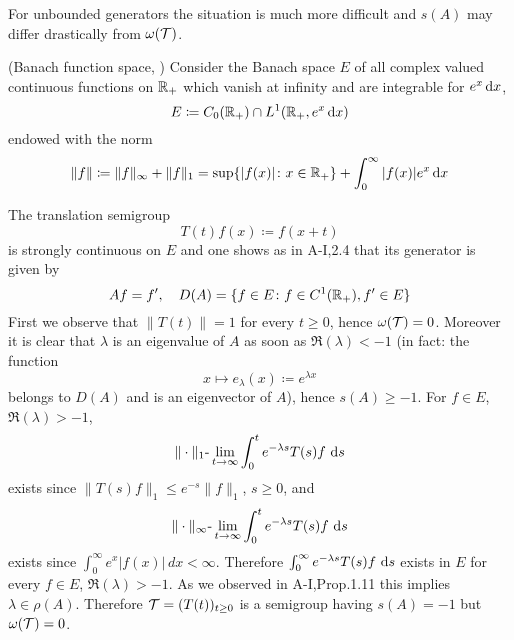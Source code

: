 For unbounded generators the situation is much more difficult and $s(A)$ may differ drastically from $\omega(\mathcal{T})$.
\begin{example}\label{ex:a3-1.3}
(Banach function space, \citet{greinervoigtwolff:1981})
Consider the Banach space $E$ of all complex valued continuous functions on $\mathbb{R}_{+}$ which vanish at infinity and are integrable for $e^{x}\mathop{}\!\mathrm{d}{x}$, \ie
\[
    E \coloneqq C_{0}(\mathbb{R}_{+}) \cap L^{1}(\mathbb{R}_{+}, e^{x}\mathop{}\!\mathrm{d}{x})
\]
endowed with the norm
\[
    \|f\| \coloneqq \|f\|_{\infty} + \|f\|_{1} = \sup\{|f(x)| \colon x \in \mathbb{R}_{+}\} + \int_{0}^{\infty} |f(x)|e^{x} \mathop{}\!\mathrm{d}{x}
\]
\end{example}
The translation semigroup
\[
    T(t)f(x) \coloneqq f(x+t)
\]
is strongly continuous on $E$ and one shows as in A-I,2.4 that its generator is given by
\[
    Af = f', \quad D(A) = \{ f \in E \colon f \in C^{1}(\mathbb{R}_{+}), f' \in E \}
\]
First we observe that $\|T(t)\| = 1$ for every $t \geq 0$, hence $\omega(\mathcal{T}) = 0$.
Moreover it is clear that $\lambda$ is an eigenvalue of $A$ as soon as $\Re(\lambda) < -1$ (in fact: the function
\[
    x \mapsto e_{\lambda}(x) \coloneqq e^{\lambda x}
\]
belongs to $D(A)$ and is an eigenvector of $A$), hence $s(A) \geq -1$.
For $f \in E$, $\Re(\lambda) > -1$,
\[
    \|\cdot\|_{1}\text{-}\lim_{t \to \infty} \int_{0}^{t} e^{-\lambda s}T(s)f \, \mathop{}\!\mathrm{d}{s}
\]
exists since $\|T(s)f\|_{1} \leq e^{-s}\|f\|_{1}$, $s \geq 0$, and
\[
    \|\cdot\|_{\infty}\text{-}\lim_{t \to \infty} \int_{0}^{t} e^{-\lambda s}T(s)f \, \mathop{}\!\mathrm{d}{s}
\]
exists since $\int_{0}^{\infty} e^{x}|f(x)| \, dx < \infty$.
Therefore $\int_{0}^{\infty} e^{-\lambda s}T(s)f \, \mathop{}\!\mathrm{d}{s}$ exists in $E$ for every $f \in E$, $\Re(\lambda) > -1$.
As we observed in A-I,Prop.1.11 this implies $\lambda \in \rho(A)$.
Therefore $\mathcal{T} = (T(t))_{t\geq 0}$ is a semigroup having $s(A) = -1$ but $\omega(\mathcal{T}) = 0$.
